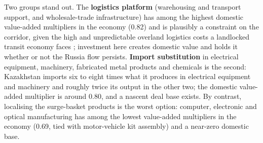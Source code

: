 \documentclass[12pt]{article}
\begin{document}
Two groups stand out. The \textbf{logistics platform} (warehousing and transport support, and
wholesale-trade infrastructure) has among the highest domestic value-added multipliers in the
economy (0.82) and is plausibly a constraint on the corridor, given the high and unpredictable
overland logistics costs a landlocked transit economy faces \citep{arvis2010landlocked};
investment here creates
domestic value and holds it whether or not the Russia flow persists. \textbf{Import substitution} in
electrical equipment, machinery, fabricated metal products and chemicals is the second:
Kazakhstan imports six to eight times what it produces in electrical equipment and machinery
and roughly twice its output in the other two; the domestic value-added multiplier is around
0.80, and a nascent deal base exists. By contrast, localising
the surge-basket products is the worst option: computer, electronic and optical manufacturing
has among the lowest value-added multipliers in the economy (0.69, tied with motor-vehicle kit
assembly) and a near-zero domestic base.
\end{document}
